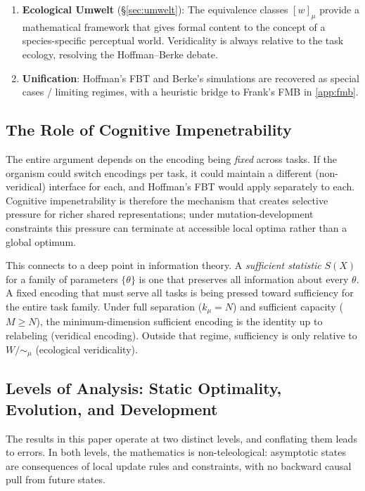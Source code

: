 \documentclass[12pt]{article}
\newcommand{\kmu}{k_\mu}
\begin{document}
\begin{enumerate}
\item \textbf{Ecological Umwelt} (\S\ref{sec:umwelt}): The equivalence classes $[w]_\mu$ provide a mathematical framework that gives formal content to the concept of a species-specific perceptual world. Veridicality is always relative to the task ecology, resolving the Hoffman--Berke debate.

\item \textbf{Unification}: Hoffman's FBT and Berke's simulations are recovered as special cases / limiting regimes, with a heuristic bridge to Frank's FMB in \cref{app:fmb}.
\end{enumerate}

\subsection{The Role of Cognitive Impenetrability}\label{sec:cog-impen-disc}

The entire argument depends on the encoding being \emph{fixed} across tasks. If the organism could switch encodings per task, it could maintain a different (non-veridical) interface for each, and Hoffman's FBT would apply separately to each. Cognitive impenetrability is therefore the mechanism that creates selective pressure for richer shared representations; under mutation-development constraints this pressure can terminate at accessible local optima rather than a global optimum.

This connects to a deep point in information theory. A \emph{sufficient statistic} $S(X)$ for a family of parameters $\{\theta\}$ is one that preserves all information about every $\theta$. A fixed encoding that must serve all tasks is being pressed toward sufficiency for the entire task family. Under full separation ($\kmu = N$) and sufficient capacity ($M \ge N$), the minimum-dimension sufficient encoding is the identity up to relabeling (veridical encoding). Outside that regime, sufficiency is only relative to $W/{\sim_\mu}$ (ecological veridicality).

\subsection{Levels of Analysis: Static Optimality, Evolution, and Development}\label{sec:levels}

The results in this paper operate at two distinct levels, and conflating them leads to errors. In both levels, the mathematics is non-teleological: asymptotic states are consequences of local update rules and constraints, with no backward causal pull from future states.
\end{document}
